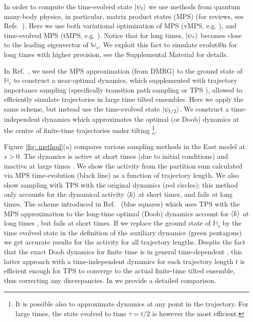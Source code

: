 \documentclass[prl,showpacs,superscriptaddress,twocolumn,longbibliography]{revtex4-1}
\begin{document}
In order to compute the time-evolved state $\ket{\psi_{t}}$ we use methods from quantum many-body {physics}, in particular, matrix product states (MPS) (for reviews, see Refs.~\cite{Schollwoeck2011, Orus2019}). Here we use both {variational optimization of MPS (vMPS, e.g. \cite{Schollwoeck2011, Banuls2019}), and time-evolved MPS (tMPS, e.g. \cite{Verstraete2004b}).
Notice that for long times, $\ket{\psi_{\tau}}$ becomes close to the leading eigenvector of $\mathbb{W}_{s}$. We exploit this fact to simulate evoluti0n for long times with higher precision, see the Supplemental Material \cite{SM} for details.}

In Ref.~\cite{Causer2021}, we used the MPS approximation (from DMRG) to the ground state of $\mathbb{H}_{s}$ to construct a near-optimal dynamics, which supplemented with trajectory importance sampling (specifically transition path sampling or TPS \cite{Bolhuis2002}), allowed to efficiently simulate trajectories in large time tilted ensembles.
Here we apply {the same scheme, but} instead use the time-evolved state $\ket{\psi_{t/2}}$. We construct a time-independent dynamics which approximates the optimal (or Doob) dynamics at the centre of finite-time trajectories under tilting \footnote{It is possible also to approximate dynamics at any point in the trajectory. For large times, the state evolved to time $\tau = t/2$ is however the most efficient.}.

Figure \ref{fig: method}(a) compares various sampling {methods} in the East model at $s>0$. The dynamics is active at short times (due to initial conditions) and inactive at large times \cite{Garrahan2007, Garrahan2009, Banuls2019}. We show the activity from the partition sum calculated via MPS time-evolution (black line) as a function of trajectory length. We also show sampling with TPS with the original dynamics (red circles); this method only accounts for the dynamical activity $\braket{k}$ at short times, and fails at long times. 
The scheme introduced in Ref.~\cite{Causer2021} (blue squares) which uses TPS with the MPS approximation to the long-time optimal (Doob) dynamics
account for $\braket{k}$ at long times \cite{Causer2021}, but fails at short times. If we replace the ground state of $\mathbb{H}_{s}$ by the time evolved state in the definition of the auxiliary dynamics 
(green pentagons) we get accurate results for the activity for all trajectory lengths. Despite the fact that the exact Doob dynamics for finite time is in general time-dependent \cite{Chetrite2015}, this latter approach with a time-independent dynamics for each trajectory length $t$ is efficient enough for  TPS to converge to the actual finite-time tilted ensemble, thus correcting any discrepancies. In \cite{SM} we provide a detailed comparison. 
\end{document}
